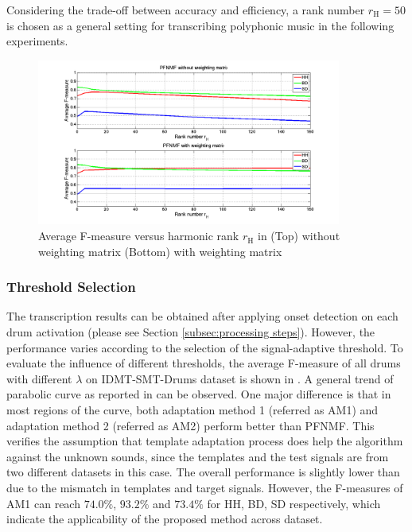 \documentclass{article}
\begin{document}
Considering the trade-off between accuracy and efficiency, a rank number $r_\mathrm{H} = 50$ is chosen as a general setting for transcribing polyphonic music in the following experiments.

\begin{figure}
 \centerline{
 \includegraphics[width=10cm]{rankTest_2.png}}
 \caption{Average F-measure versus harmonic rank $r_\mathrm{H}$ in (Top) without weighting matrix (Bottom) with weighting matrix}
 \label{fig:rankTest}
\end{figure}

\subsubsection{Threshold Selection}\label{subsec:threshold}
The transcription results can be obtained after applying onset detection on each drum activation (please see Section \ref{subsec:processing steps}). However, the performance varies according to the selection of the signal-adaptive threshold. To evaluate the influence of different thresholds, the average F-measure of all drums with different $\lambda$ on IDMT-SMT-Drums dataset is shown in . A general trend of parabolic curve as reported in \cite{Dittmar2014} can be observed. One major difference is that in most regions of the curve, both adaptation method 1 (referred as AM1) and adaptation method 2 (referred as AM2) perform better than PFNMF. This verifies the assumption that template adaptation process does help the algorithm against the unknown sounds, since the templates and the test signals are from two different datasets in this case. The overall performance is slightly lower than \cite{Dittmar2014} due to the mismatch in templates and target signals. However, the F-measures of AM1 can reach $74.0\%$, $93.2\%$ and $73.4\%$ for HH, BD, SD respectively, which indicate the applicability of the proposed method across dataset. 
\end{document}
